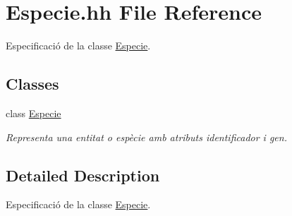 \hypertarget{_especie_8hh}{}\section{Especie.\+hh File Reference}
\label{_especie_8hh}


Especificació de la classe \hyperlink{class_especie}{Especie}.  


\subsection*{Classes}
\begin{DoxyCompactItemize}
\item 
class \hyperlink{class_especie}{Especie}
\begin{DoxyCompactList}\small\item\em Representa una entitat o espècie amb atributs identificador i gen. \end{DoxyCompactList}\end{DoxyCompactItemize}


\subsection{Detailed Description}
Especificació de la classe \hyperlink{class_especie}{Especie}. 

